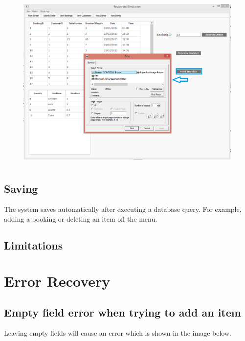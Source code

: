 \begin{figure}[H]
    \includegraphics[height = 9cm]{./Manual/images/PrintInvoice4} 
    \caption{} \label{fig:printinvoice4}
\end{figure}






\subsection{Saving}

The system saves automatically after executing a database query. For example, adding a booking or deleting an item off the menu.

\subsection{Limitations}

\section{Error Recovery}

\subsection{Empty field error when trying to add an item}

Leaving empty fields will cause an error which is shown in the image below. \\


